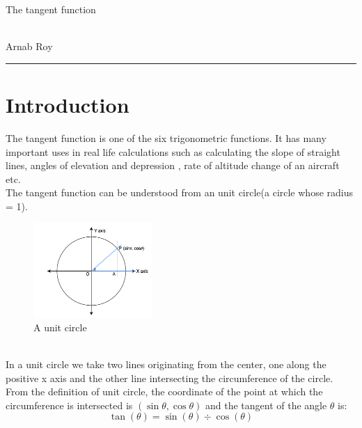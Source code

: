 \documentclass[12pt]{article}
\begin{document}
\begin{center}
    \huge{The tangent function}
    
    \\[10pt]
    
    \large{Arnab Roy}
\end{center}
\rule{\textwidth}{0.5pt}

\section{Introduction}
    The tangent function is one of the six trigonometric functions. It has many important uses in real life calculations such as calculating the slope of straight lines, angles of elevation and depression \cite{tanexamplewebsite1}, rate of altitude change of an aircraft \cite{tanexamplewebsite2} etc. \\
    The tangent function can be understood from an unit circle(a circle whose radius = 1).
    \begin{figure} [!h]
        \centering
        \includegraphics[width=0.4\textwidth]{Unit-circle.png}
        \caption{A unit circle}
        \label{fig:unit_circle}
    \end{figure} \\
    In a unit circle we take two lines originating from the center, one along the positive x axis and the other line intersecting the circumference of the circle. From the definition of unit circle, the coordinate of the point at which the circumference is intersected is $(\sin\theta, \cos\theta)$ \cite{unitcirclewebsite} and the tangent of the angle $\theta$ is:
    \begin{equation}
        \tan(\theta) = \sin(\theta) \div \cos(\theta) \label{tan_formula_1}
    \end{equation}
\end{document}
